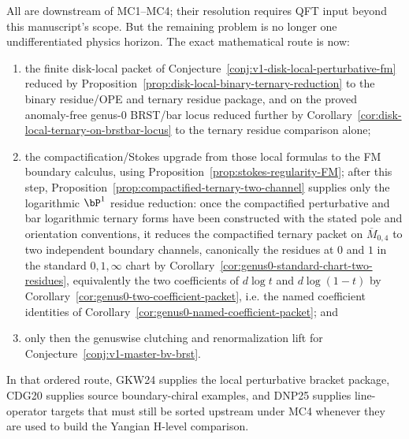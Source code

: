 \begin{remark}
All are downstream of MC1--MC4; their resolution requires QFT input
beyond this manuscript's scope. But the remaining problem is no longer one
undifferentiated physics horizon. The exact mathematical route is now:
\begin{enumerate}[label=\textup{(\roman*)},nosep]
\item the finite disk-local packet of
 Conjecture~\ref{conj:v1-disk-local-perturbative-fm}
 reduced by
 Proposition~\ref{prop:disk-local-binary-ternary-reduction}
 to the binary residue/OPE and ternary residue package, and on the
 proved anomaly-free genus-$0$ BRST/bar locus reduced further by
 Corollary~\ref{cor:disk-local-ternary-on-brstbar-locus} to the
 ternary residue comparison alone;
\item the compactification/Stokes upgrade from those local formulas to
 the FM boundary calculus, using
 Proposition~\ref{prop:stokes-regularity-FM}; after this step,
 Proposition~\ref{prop:compactified-ternary-two-channel} supplies only
 the logarithmic $\bP^1$ residue reduction: once the compactified
 perturbative and bar logarithmic ternary forms have been constructed
 with the stated pole and orientation conventions, it reduces the
 compactified ternary packet on $\overline{M}_{0,4}$ to two independent
 boundary channels, canonically the residues at $0$ and $1$ in the
 standard $0,1,\infty$ chart by
 Corollary~\ref{cor:genus0-standard-chart-two-residues}, equivalently
 the two coefficients of $d\log t$ and $d\log(1-t)$ by
 Corollary~\ref{cor:genus0-two-coefficient-packet}, i.e. the named
 coefficient identities of
 Corollary~\ref{cor:genus0-named-coefficient-packet}; and
\item only then the genuswise clutching and renormalization lift for
 Conjecture~\ref{conj:v1-master-bv-brst}.
\end{enumerate}
In that ordered route, GKW24 supplies the local perturbative bracket
package, CDG20 supplies source boundary-chiral examples, and DNP25
supplies line-operator targets that must still be sorted upstream under
MC4 whenever they are used to build the Yangian H-level comparison.


\end{remark}
